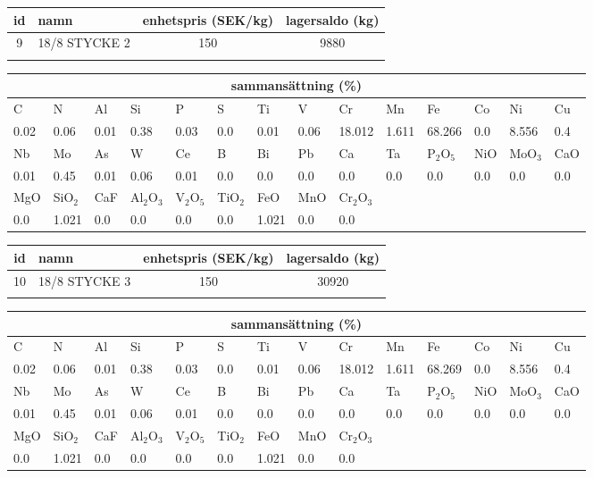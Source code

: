 \begin{center}
{\scriptsize\addtolength{\tabcolsep}{-3pt}
\begin{tabular}{clcc}
id&namn&enhetspris (SEK/kg)&lagersaldo (kg)\\
\hline
9&18/8 STYCKE 2&150&9880\\\\
\end{tabular}
\begin{tabular}{llllllllllllll}
\multicolumn{14}{c}{sammansättning (\%)}\\
\hline
C&N&Al&Si&P&S&Ti&V&Cr&Mn&Fe&Co&Ni&Cu\\
\hline
0.02&0.06&0.01&0.38& 0.03&0.0&0.01&0.06& 18.012&1.611&68.266&0.0& 8.556&0.4\\
\hline
Nb&Mo&As&W&Ce&B&Bi&Pb&Ca&Ta&P$_2$O$_5$&NiO&MoO$_3$&CaO\\
\hline
0.01& 0.45& 0.01& 0.06& 0.01& 0.0& 0.0& 0.0& 0.0& 0.0& 0.0& 0.0& 0.0& 0.0\\
\hline
MgO&SiO$_2$&CaF&Al$_2$O$_3$&V$_2$O$_5$&TiO$_2$&FeO&MnO&Cr$_2$O$_3$\\
\hline
0.0& 1.021& 0.0& 0.0& 0.0& 0.0& 1.021& 0.0& 0.0\\
\end{tabular}
}
\end{center}

\begin{center}
{\scriptsize\addtolength{\tabcolsep}{-3pt}
\begin{tabular}{clcc}
id&namn&enhetspris (SEK/kg)&lagersaldo (kg)\\
\hline
10&18/8 STYCKE 3&150&30920\\\\
\end{tabular}
\begin{tabular}{llllllllllllll}
\multicolumn{14}{c}{sammansättning (\%)}\\
\hline
C&N&Al&Si&P&S&Ti&V&Cr&Mn&Fe&Co&Ni&Cu\\
\hline
0.02&0.06&0.01&0.38& 0.03&0.0&0.01&0.06& 18.012&1.611&68.269&0.0& 8.556&0.4\\
\hline
Nb&Mo&As&W&Ce&B&Bi&Pb&Ca&Ta&P$_2$O$_5$&NiO&MoO$_3$&CaO\\
\hline
0.01& 0.45& 0.01& 0.06& 0.01& 0.0& 0.0& 0.0& 0.0& 0.0& 0.0& 0.0& 0.0& 0.0\\
\hline
MgO&SiO$_2$&CaF&Al$_2$O$_3$&V$_2$O$_5$&TiO$_2$&FeO&MnO&Cr$_2$O$_3$\\
\hline
0.0& 1.021& 0.0& 0.0& 0.0& 0.0& 1.021& 0.0& 0.0\\
\end{tabular}
}
\end{center}

